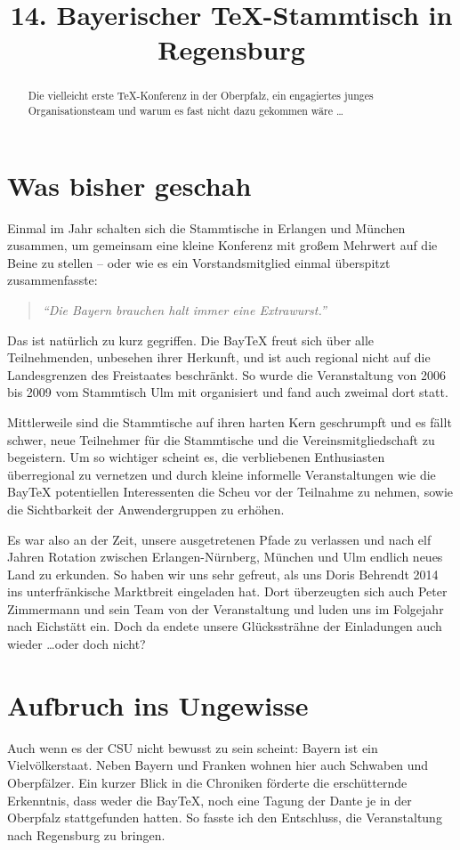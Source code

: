 \documentclass[ngerman]{dtk}
\title{14. Bayerischer \TeX{}-Stammtisch in Regensburg}
\begin{document}
\maketitle
{}

\begin{abstract}
Die vielleicht erste \TeX{}-Konferenz in der Oberpfalz,
ein engagiertes junges Organisationsteam und warum es fast nicht dazu gekommen wäre \ldots
\end{abstract} 

\section{Was bisher geschah}
Einmal im Jahr schalten sich die Stammtische in Erlangen und München zusammen,
um gemeinsam eine kleine Konferenz mit großem Mehrwert auf die Beine zu stellen
-- oder wie es ein Vorstandsmitglied einmal überspitzt zusammenfasste:
\begin{quote}
\itshape \enquote{Die Bayern brauchen halt immer eine Extrawurst.}
\end{quote}
Das ist natürlich zu kurz gegriffen. Die Bay\TeX{} freut sich über alle Teilnehmenden,
unbesehen ihrer Herkunft, und ist auch regional nicht auf die Landesgrenzen des Freistaates beschränkt.
So wurde die Veranstaltung von 2006 bis 2009 vom Stammtisch Ulm mit organisiert und fand auch zweimal dort statt.

Mittlerweile sind die Stammtische auf ihren harten Kern geschrumpft und es fällt schwer,
neue Teilnehmer für die Stammtische und die Vereinsmitgliedschaft zu begeistern.
Um so wichtiger scheint es, die verbliebenen Enthusiasten überregional zu vernetzen
und durch kleine informelle Veranstaltungen wie die Bay\TeX{} potentiellen Interessenten die Scheu vor der Teilnahme zu nehmen,
sowie die Sichtbarkeit der Anwendergruppen zu erhöhen.

Es war also an der Zeit, unsere ausgetretenen Pfade zu verlassen und nach elf Jahren Rotation
zwischen Erlangen-Nürnberg, München und Ulm endlich neues Land zu erkunden.
So haben wir uns sehr gefreut, als uns Doris Behrendt 2014 ins unterfränkische Marktbreit eingeladen hat.
Dort überzeugten sich auch Peter Zimmermann und sein Team von der Veranstaltung und luden uns im Folgejahr nach Eichstätt ein.
Doch da endete unsere Glückssträhne der Einladungen auch wieder \ldots oder doch nicht?

\section{Aufbruch ins Ungewisse}
Auch wenn es der CSU nicht bewusst zu sein scheint: Bayern ist ein Vielvölkerstaat.
Neben Bayern und Franken wohnen hier auch Schwaben und Oberpfälzer.
Ein kurzer Blick in die Chroniken förderte die erschütternde Erkenntnis,
dass weder die Bay\TeX{}, noch eine Tagung der Dante je in der Oberpfalz stattgefunden hatten.
So fasste ich den Entschluss, die Veranstaltung nach Regensburg zu bringen.
\end{document}
